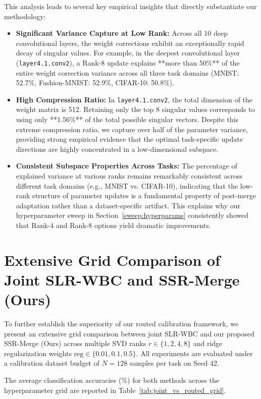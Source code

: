 \documentclass{article}
\theoremstyle{plain}
\theoremstyle{definition}
\theoremstyle{remark}
\begin{document}
This analysis leads to several key empirical insights that directly substantiate our methodology:
\begin{itemize}
    \item \textbf{Significant Variance Capture at Low Rank:} Across all 10 deep convolutional layers, the weight corrections exhibit an exceptionally rapid decay of singular values. For example, in the deepest convolutional layer (\texttt{layer4.1.conv2}), a Rank-8 update explains **more than 50\%** of the entire weight correction variance across all three task domains (MNIST: 52.7\%, Fashion-MNIST: 52.9\%, CIFAR-10: 50.8\%).
    \item \textbf{High Compression Ratio:} In \texttt{layer4.1.conv2}, the total dimension of the weight matrix is 512. Retaining only the top 8 singular values corresponds to using only **1.56\%** of the total possible singular vectors. Despite this extreme compression ratio, we capture over half of the parameter variance, providing strong empirical evidence that the optimal task-specific update directions are highly concentrated in a low-dimensional subspace.
    \item \textbf{Consistent Subspace Properties Across Tasks:} The percentage of explained variance at various ranks remains remarkably consistent across different task domains (e.g., MNIST vs. CIFAR-10), indicating that the low-rank structure of parameter updates is a fundamental property of post-merge adaptation rather than a dataset-specific artifact. This explains why our hyperparameter sweep in Section~\ref{sweep:hyperparams} consistently showed that Rank-4 and Rank-8 options yield dramatic improvements.
\end{itemize}

\section{Extensive Grid Comparison of Joint SLR-WBC and SSR-Merge (Ours)}
To further establish the superiority of our routed calibration framework, we present an extensive grid comparison between joint SLR-WBC and our proposed SSR-Merge (Ours) across multiple SVD ranks $r \in \{1, 2, 4, 8\}$ and ridge regularization weights $\text{reg} \in \{0.01, 0.1, 0.5\}$. All experiments are evaluated under a calibration dataset budget of $N=128$ samples per task on Seed 42.

The average classification accuracies (\%) for both methods across the hyperparameter grid are reported in Table~\ref{tab:joint_vs_routed_grid}.
\end{document}
